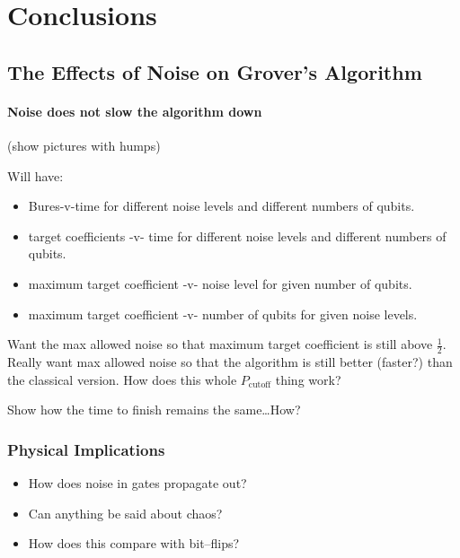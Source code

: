 
\chapter{Conclusions}
\label{chap:conclusion}
%

\section{The Effects of Noise on Grover's Algorithm}

\subsubsection{Noise does not slow the algorithm down}

(show pictures with humps)

Will have:
\begin{itemize}
\item Bures-v-time for different noise levels and different numbers of qubits.
\item target coefficients -v- time for different noise levels and different numbers
of qubits.
\item maximum target coefficient -v- noise level for given number of qubits.
\item maximum target coefficient -v- number of qubits for given noise levels.
\end{itemize}
Want the max allowed noise so that maximum target coefficient is still above 
$\frac{1}{2}$.  Really want max allowed noise so that the algorithm is still
better (faster?) than the classical version.  How does this whole
$P_{\text{cutoff}}$ thing work?\cite{Pablo-Norman/Ruiz-Altaba:99}

Show how the time to finish remains the same\dots How?



\subsection{Physical Implications}

\begin{itemize}
\item How does noise in gates propagate out?
\item Can anything be said about chaos?
\item How does this compare with bit--flips?
\end{itemize}



